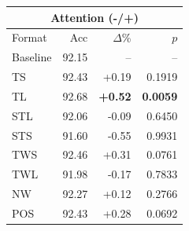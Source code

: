 \begin{tabular}{lrrr}
\toprule
\multicolumn{4}{c}{\textbf{Attention (-/+)}} \\
\midrule
Format & Acc & $\Delta$\% & $p$ \\
\midrule
Baseline & 92.15 & -- & -- \\
\midrule
TS & 92.43 & +0.19 & 0.1919 \\
TL & 92.68 & \textbf{+0.52} & \textbf{0.0059} \\
STL & 92.06 & -0.09 & 0.6450 \\
STS & 91.60 & -0.55 & 0.9931 \\
TWS & 92.46 & +0.31 & 0.0761 \\
TWL & 91.98 & -0.17 & 0.7833 \\
NW & 92.27 & +0.12 & 0.2766 \\
POS & 92.43 & +0.28 & 0.0692 \\
\bottomrule
\end{tabular}